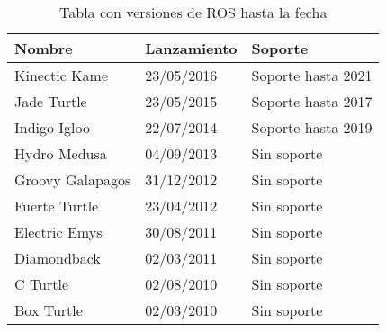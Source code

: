 \begin{table}[!ht]
\begin{center}
\begin{tabular}{|p{50mm}|p{35mm}|p{60mm}|} \hline 
\textbf{Nombre} & \textbf{Lanzamiento} & \textbf{Soporte}\\ \hline
Kinectic Kame
&
23/05/2016
&
Soporte hasta 2021
\\
\hline

Jade Turtle
&
23/05/2015
&
Soporte hasta 2017
\\
\hline

Indigo Igloo
&
22/07/2014
&
Soporte hasta 2019
\\
\hline

Hydro Medusa
&
04/09/2013
&
Sin soporte
\\
\hline

Groovy Galapagos
&
31/12/2012
&
Sin soporte
\\
\hline

Fuerte Turtle
&
23/04/2012
&
Sin soporte
\\
\hline

Electric Emys
&
30/08/2011
&
Sin soporte
\\
\hline

Diamondback
&
02/03/2011
&
Sin soporte
\\
\hline

C Turtle
&
02/08/2010
&
Sin soporte
\\
\hline

Box Turtle
&
02/03/2010
&
Sin soporte
\\
\hline


\end{tabular}
\end{center}
\caption{Tabla con versiones de ROS hasta la fecha}
\label{table:playstation-camera}
\end{table}
